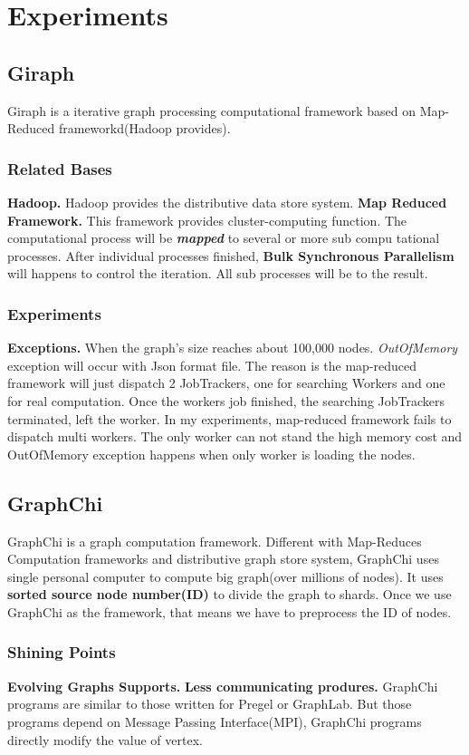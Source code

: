 \documentclass{article}
\begin{document}
	\newpage
	\section{Experiments}
	\subsection{Giraph}
	Giraph is a iterative graph processing computational framework based on Map-Reduced frameworkd(Hadoop provides).
	\subsubsection{Related Bases}
	\textbf{Hadoop.} Hadoop provides the distributive data store system.
	\textbf{Map Reduced Framework\cite{lammel2008google's}.} This framework provides cluster-computing function. The computational process will be \textbf{\emph{mapped}} to several or more sub compu tational processes. After individual processes finished, \textbf{Bulk Synchronous Parallelism\cite{gerbessiotis1994direct}} will happens to control the iteration. All sub processes will be  to the result.
	\subsubsection{Experiments}
	\textbf{Exceptions.} When the graph's size reaches about 100,000 nodes. \emph{OutOfMemory} exception will occur with Json format file. The reason is the map-reduced framework will just dispatch 2 JobTrackers, one for searching Workers and one for real computation. Once the workers job finished, the searching JobTrackers terminated, left the worker. In my experiments, map-reduced framework fails to dispatch multi workers. The only worker can not stand the high memory cost and OutOfMemory exception happens when only worker is loading the nodes.
	\subsection{GraphChi\cite{kyrola2012graphchi:}}
	GraphChi is a graph computation framework. Different with Map-Reduces Computation frameworks and distributive graph store system, GraphChi uses single personal computer to compute big graph(over millions of nodes). It uses \textbf{sorted source node number(ID)} to divide the graph to shards. Once we use GraphChi as the framework, that means we have to preprocess the ID of nodes.
	\subsubsection{Shining Points}
	\textbf{Evolving Graphs Supports.}\newline
	\textbf{Less communicating produres.} GraphChi programs are similar to those written for Pregel\cite{malewicz2009pregel:} or GraphLab\cite{low2014graphlab:}. But those programs depend on Message Passing Interface(MPI)\cite{meyer1993message-passing}, GraphChi programs directly modify the value of vertex.
\end{document}
